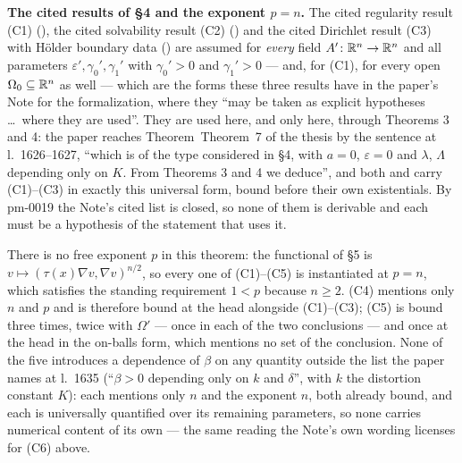 \begin{theorem}[Theorem 7]
\medskip
\noindent\textbf{The cited results of \S4 and the exponent $p=n$.}  The cited
regularity result (C1) (), the cited solvability
result (C2) () and the cited Dirichlet result (C3)
with H\"older boundary data () are assumed for
\emph{every} field $A'\colon\mathbb{R}^n\to\mathbb{R}^n$ and all parameters
$\varepsilon',\gamma_0',\gamma_1'$ with $\gamma_0'>0$ and $\gamma_1'>0$ --- and,
for (C1), for every open $\Omega_0\subseteq\mathbb{R}^n$ as well --- which are the forms
these three results have in the paper's Note for the formalization, where they
``may be taken as explicit hypotheses \ldots\ where they are used''.  They are
used here, and only here, through Theorems 3 and 4: the paper reaches
Theorem~Theorem~7 of the thesis by the sentence at l.~1626--1627, ``which is of the type
considered in \S4, with $a=0$, $\varepsilon=0$ and $\lambda$, $\Lambda$
depending only on $K$.  From Theorems 3 and 4 we deduce'', and both
 and  carry
(C1)--(C3) in exactly this universal form, bound before their own existentials.
By pm-0019 the Note's cited list is closed, so none of them is derivable and
each must be a hypothesis of the statement that uses it.

There is no free exponent $p$ in this theorem: the functional of \S5 is
$v\mapsto(\tau(x)\nabla v,\nabla v)^{n/2}$, so every one of (C1)--(C5) is
instantiated at $p=n$, which satisfies the standing requirement $1<p$ because
$n\ge2$.  (C4) mentions only $n$ and $p$ and is therefore bound at the head
alongside (C1)--(C3); (C5) is bound three times, twice with $\Omega'$ --- once in
each of the two conclusions --- and once at the head in the on-balls form, which
mentions no set of the conclusion.  None of the five introduces a dependence of $\beta$ on
any quantity outside the list the paper names at l.~1635 (``$\beta>0$ depending
only on $k$ and $\delta$'', with $k$ the distortion constant $K$): each mentions
only $n$ and the exponent $n$, both already bound, and each is universally
quantified over its remaining parameters, so none carries numerical content of
its own --- the same reading the Note's own wording licenses for (C6) above.


\end{theorem}
